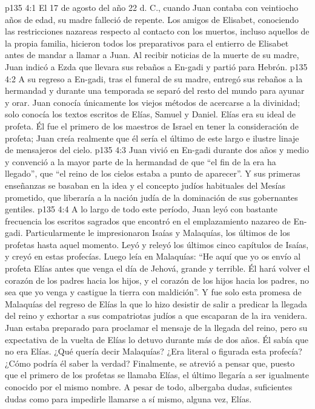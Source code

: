 \vs p135 4:1 El 17 de agosto del año 22 d. C., cuando Juan contaba con veintiocho años de edad, su madre falleció de repente. Los amigos de Elisabet, conociendo las restricciones nazareas respecto al contacto con los muertos, incluso aquellos de la propia familia, hicieron todos los preparativos para el entierro de Elisabet antes de mandar a llamar a Juan. Al recibir noticias de la muerte de su madre, Juan indicó a Ezda que llevara sus rebaños a En\hyp{}gadi y partió para Hebrón.
\vs p135 4:2 A su regreso a En\hyp{}gadi, tras el funeral de su madre, entregó sus rebaños a la hermandad y durante una temporada se separó del resto del mundo para ayunar y orar. Juan conocía únicamente los viejos métodos de acercarse a la divinidad; solo conocía los textos escritos de Elías, Samuel y Daniel. Elías era su ideal de profeta. Él fue el primero de los maestros de Israel en tener la consideración de profeta; Juan creía realmente que él sería el último de este largo e ilustre linaje de mensajeros del cielo.
\vs p135 4:3 Juan vivió en En\hyp{}gadi durante dos años y medio y convenció a la mayor parte de la hermandad de que “el fin de la era ha llegado”, que “el reino de los cielos estaba a punto de aparecer”. Y sus primeras enseñanzas se basaban en la idea y el concepto judíos habituales del Mesías prometido, que liberaría a la nación judía de la dominación de sus gobernantes gentiles.
\vs p135 4:4 A lo largo de todo este período, Juan leyó con bastante frecuencia los escritos sagrados que encontró en el emplazamiento nazareo de En\hyp{}gadi. Particularmente le impresionaron Isaías y Malaquías, los últimos de los profetas hasta aquel momento. Leyó y releyó los últimos cinco capítulos de Isaías, y creyó en estas profecías. Luego leía en Malaquías: “He aquí que yo os envío al profeta Elías antes que venga el día de Jehová, grande y terrible. Él hará volver el corazón de los padres hacia los hijos, y el corazón de los hijos hacia los padres, no sea que yo venga y castigue la tierra con maldición”. Y fue solo esta promesa de Malaquías del regreso de Elías la que lo hizo desistir de salir a predicar la llegada del reino y exhortar a sus compatriotas judíos a que escaparan de la ira venidera. Juan estaba preparado para proclamar el mensaje de la llegada del reino, pero su expectativa de la vuelta de Elías lo detuvo durante más de dos años. Él sabía que no era Elías. ¿Qué quería decir Malaquías? ¿Era literal o figurada esta profecía? ¿Cómo podría él saber la verdad? Finalmente, se atrevió a pensar que, puesto que el primero de los profetas se llamaba Elías, el último llegaría a ser igualmente conocido por el mismo nombre. A pesar de todo, albergaba dudas, suficientes dudas como para impedirle llamarse a sí mismo, alguna vez, Elías.
